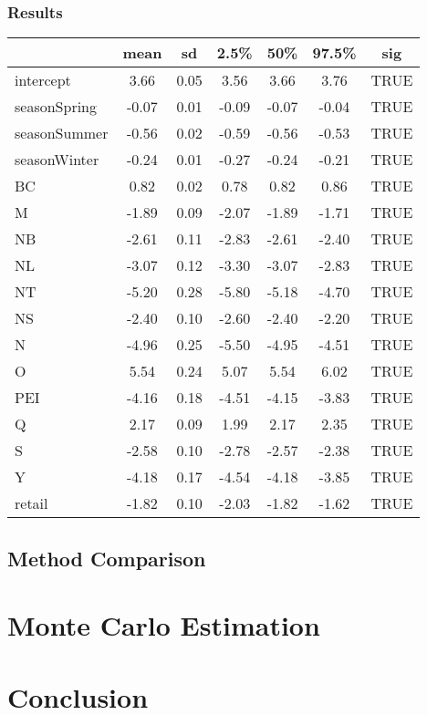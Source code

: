 \documentclass[12pt]{article}
\begin{document}
\subsubsection*{Results}
\begin{table}[hbt!]
    \centering
    \begin{tabular}{|l|c|c|c|c|c|c|}
      \hline
     & mean & sd & 2.5\% & 50\% & 97.5\% & sig \\ 
     \hline
     intercept & 3.66 & 0.05 & 3.56 & 3.66 & 3.76 & TRUE \\ 
       seasonSpring & -0.07 & 0.01 & -0.09 & -0.07 & -0.04 & TRUE \\ 
       seasonSummer & -0.56 & 0.02 & -0.59 & -0.56 & -0.53 & TRUE \\ 
       seasonWinter & -0.24 & 0.01 & -0.27 & -0.24 & -0.21 & TRUE \\ 
       BC & 0.82 & 0.02 & 0.78 & 0.82 & 0.86 & TRUE \\ 
       M & -1.89 & 0.09 & -2.07 & -1.89 & -1.71 & TRUE \\ 
       NB & -2.61 & 0.11 & -2.83 & -2.61 & -2.40 & TRUE \\ 
       NL & -3.07 & 0.12 & -3.30 & -3.07 & -2.83 & TRUE \\ 
       NT & -5.20 & 0.28 & -5.80 & -5.18 & -4.70 & TRUE \\ 
       NS & -2.40 & 0.10 & -2.60 & -2.40 & -2.20 & TRUE \\ 
       N & -4.96 & 0.25 & -5.50 & -4.95 & -4.51 & TRUE \\ 
       O & 5.54 & 0.24 & 5.07 & 5.54 & 6.02 & TRUE \\ 
       PEI & -4.16 & 0.18 & -4.51 & -4.15 & -3.83 & TRUE \\ 
       Q & 2.17 & 0.09 & 1.99 & 2.17 & 2.35 & TRUE \\ 
       S & -2.58 & 0.10 & -2.78 & -2.57 & -2.38 & TRUE \\ 
       Y & -4.18 & 0.17 & -4.54 & -4.18 & -3.85 & TRUE \\ 
       retail & -1.82 & 0.10 & -2.03 & -1.82 & -1.62 & TRUE \\ 
        \hline
    \end{tabular}
\end{table}
    
\subsection{Method Comparison}


\newpage
\section{Monte Carlo Estimation}

\newpage
\section{Conclusion}


 
\end{document}
